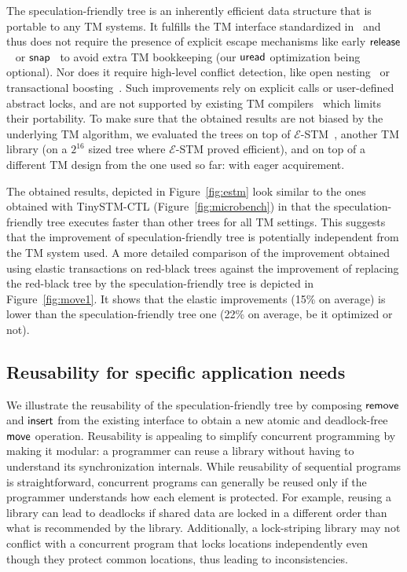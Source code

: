 The speculation-friendly tree is an inherently efficient data structure that is portable to any TM systems.
It fulfills the TM interface standardized in~\cite{abi} and thus does not require the presence of explicit
escape mechanisms like early $\lit{release}$~\cite{HLMS03} or $\lit{snap}$~\cite{CH05} to avoid extra TM bookkeeping 
(our $\act{uread}$ optimization being optional).
Nor does it require high-level conflict detection, like open nesting~\cite{Mos06,NMA+07,ALS09} or transactional boosting~\cite{HK08}. Such improvements rely on 
explicit calls or user-defined abstract locks, and are not supported by existing TM compilers~\cite{abi} which limits their portability.
%
To make sure that the obtained results are not biased by the underlying TM algorithm,
we evaluated the trees on top of ${\mathcal E}$-STM~\cite{FGG09}, another TM library (on a $2^{16}$ sized tree where ${\mathcal E}$-STM proved efficient),
and on top of a different TM design from the one used so far: with eager acquirement.

The obtained results, depicted in Figure~\ref{fig:estm} look similar to the ones obtained with TinySTM-CTL
(Figure~\ref{fig:microbench}) in that the speculation-friendly tree executes faster than other trees for all TM settings.
This suggests that the improvement of speculation-friendly tree 
is potentially independent from the TM system used.
A more detailed comparison of the improvement obtained
using elastic transactions on red-black trees against the improvement of replacing the red-black tree by the speculation-friendly tree
is depicted in Figure~\ref{fig:move1}. It shows that the elastic improvements (15\% on average) is lower than the 
speculation-friendly tree one (22\% on average, be it optimized or not). 

\subsection{Reusability for specific application needs}

We illustrate the reusability of the speculation-friendly tree by composing $\act{remove}$ and $\act{insert}$ from the existing interface to obtain a new
atomic and deadlock-free $\act{move}$ operation.
Reusability is appealing to simplify concurrent programming by making it modular:
a programmer can reuse a library without having to understand its synchronization internals.
While reusability of sequential programs is straightforward, concurrent programs can generally be reused only 
if the programmer understands how each element is protected. For example, reusing a library can lead to deadlocks
if shared data are locked in a different order than what is recommended by the library. Additionally, a lock-striping library
may not conflict with a concurrent program that locks locations independently even though they protect common locations, 
thus leading to inconsistencies.

